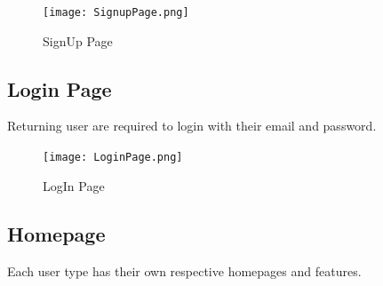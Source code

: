 \begin{figure}[H]
	\centering
	\texttt{[image: SignupPage.png]}
	\caption{SignUp Page}
	\label{fig:signup_page}
\end{figure}

\subsection{Login Page}
Returning user are required to login with their email and password.

\begin{figure}[H]
	\centering
	\texttt{[image: LoginPage.png]}
	\caption{LogIn Page}
	\label{fig:login_page}
\end{figure}

\subsection{Homepage}
Each user type has their own respective homepages and features.
